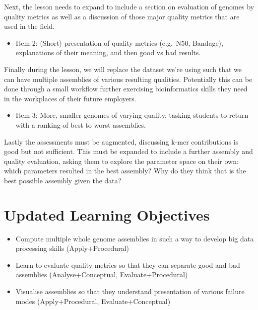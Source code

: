 \documentclass[paper=a4,justified,a4paper]{tufte-handout}
\providecommand{\tightlist}{%
  \setlength{\itemsep}{0pt}\setlength{\parskip}{0pt}}
\begin{document}
Next, the lesson needs to expand to include a section on evaluation of
genomes by quality metrics as well as a discussion of those major
quality metrics that are used in the field.

\begin{itemize}
\tightlist
\item
  Item 2: (Short) presentation of quality metrics (e.g.~N50, Bandage),
  explanations of their meaning, and then good vs bad results.
\end{itemize}

Finally during the lesson, we will replace the dataset we're using such
that we can have multiple assemblies of various resulting qualities.
Potentially this can be done through a small workflow further exercising
bioinformatics skills they need in the workplaces of their future
employers.

\begin{itemize}
\tightlist
\item
  Item 3: More, smaller genomes of varying quality, tasking students to
  return with a ranking of best to worst assemblies.
\end{itemize}

Lastly the assessments must be augmented, discussing k-mer contributions
is good but not sufficient. This must be expanded to include a further
assembly and quality evaluation, asking them to explore the parameter
space on their own: which parameters resulted in the best assembly? Why
do they think that is the best possible assembly given the data?

\hypertarget{updated-learning-objectives}{%
\section{Updated Learning
Objectives}\label{updated-learning-objectives}}

\begin{itemize}
\tightlist
\item
  Compute multiple whole genome assemblies in such a way to develop big
  data processing skills (Apply+Procedural)
\item
  Learn to evaluate quality metrics so that they can separate good and
  bad assemblies (Analyse+Conceptual, Evaluate+Procedural)
\item
  Visualise assemblies so that they understand presentation of various
  failure modes (Apply+Procedural, Evaluate+Conceptual)
\end{itemize}
\end{document}
